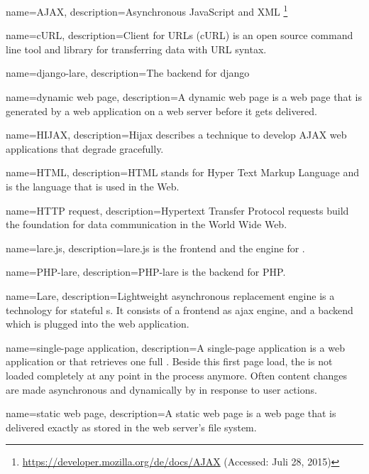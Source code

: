 \usepackage{glossaries}

{
  name=AJAX,
  description={Asynchronous JavaScript and XML \footnote{\url{https://developer.mozilla.org/de/docs/AJAX} (Accessed: Juli 28, 2015)}}
}

{
  name=cURL,
  description={Client for URLs (cURL) is an open source command line tool and library for transferring data with URL syntax.}
}

{
  name=django-lare,
  description={The \lare{} backend for django}
}

{
  name=dynamic web page,  
  description={A dynamic web page is a web page that is generated by a web application on a web server before it gets delivered.}
}

{
  name=HIJAX,
  description={Hijax describes a technique to develop AJAX web applications that degrade gracefully.}
}

{
  name=HTML,
  description={HTML stands for Hyper Text Markup Language and is the language that is used in the Web.}
}

{
  name=HTTP request,
  description={Hypertext Transfer Protocol requests build the foundation for data communication in the World Wide Web.}
}

{
  name=lare.js,
  description={lare.js is the \lare{} frontend and the \ajax{} engine for \lare{}.}
}

{
  name=PHP-lare,
  description={PHP-lare is the \lare{} backend for PHP.}
}

{
  name=Lare,
  description={Lightweight asynchronous replacement engine is a technology for stateful \singlePageApplication{}s.
  It consists of a \lare{} frontend as ajax engine, and a \lare{} backend which is plugged into the web application.}
}

{
  name=single-page application,
  description={A single-page application is a web application or \webSite{} that retrieves one full \webPage{}.
  Beside this first page load, the \webSite{} is not loaded completely at any point in the process anymore.
  Often content changes are made asynchronous and dynamically by \ajax{} in response to user actions.}
}

{
  name=static web page,
  description={A static web page is a web page that is delivered exactly as stored in the web server's file system.}
}

